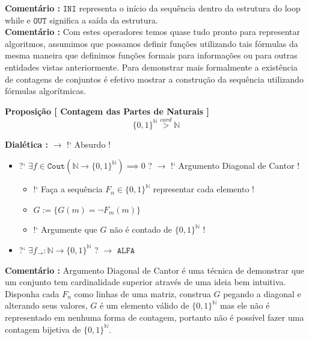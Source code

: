 \documentclass[10pt,a4paper]{report}
\begin{document}
\textbf{Comentário :} $\texttt{INI}$ representa o início da sequência dentro da estrutura do loop while e $\texttt{OUT}$ significa a saída da estrutura.\\

\textbf{Comentário :} Com estes operadores temos quase tudo pronto para representar algoritmos, assumimos que possamos definir funções utilizando tais fórmulas da mesma maneira que definimos funções formais para informações ou para outras entidades vistas anteriormente. Para demonstrar mais formalmente a existência de contagens de conjuntos é efetivo mostrar a construção da sequência utilizando fórmulas algorítmicas.

\hspace{\baselineskip}

\textbf{Proposição [ Contagem das Partes de Naturais ]} $$ \{0,1\}^{\mathbb{N}} \overset{card}{>} \mathbb{N} $$

\textbf{Dialética :} $\rightarrow$ !` Absurdo !

\begin{itemize}
	\item[ ] ?` $  \exists f \in \texttt{Cout}(  \mathbb{N} \rightarrow \{0,1\}^{\mathbb{N}} ) \implies 0 $ ? $\rightarrow$ !` Argumento Diagonal de Cantor !
	\begin{itemize}
		\item[ ] !` Faça a sequência $F_n \in \{0,1\}^{\mathbb{N}}$ representar cada elemento !
		\item[ ] $ G:= \{ G(m) = \neg F_m(m) \} $
		\item[ ] !` Argumente que $G$ não é contado de $ \{0,1\}^{ \mathbb{N} } $ !
	\end{itemize}
	\item[ ] ?` $ \exists f_{\rightarrow} : \mathbb{N} \rightarrow \{0,1\}^{\mathbb{N}} $ ? $\rightarrow$ $\texttt{ALFA}$
\end{itemize}

\textbf{Comentário :} Argumento Diagonal de Cantor é uma técnica de demonstrar que um conjunto tem cardinalidade superior através de uma ideia bem intuitiva. Disponha cada $F_n$ como linhas de uma matriz, construa $G$ pegando a diagonal e alterando seus valores, $G$ é um elemento válido de $\{0,1\}^{\mathbb{N}}$ mas ele não é representado em nenhuma forma de contagem, portanto não é possível fazer uma contagem bijetiva de $ \{0,1\}^{ \mathbb{N} } $.\\
\end{document}
